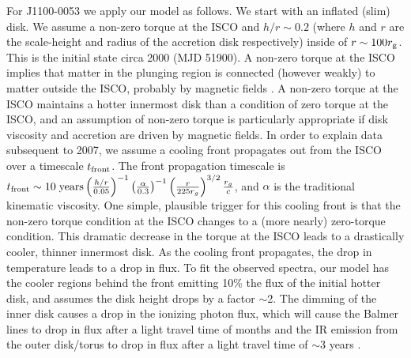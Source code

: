 \documentclass{nature}
\begin{document}
For J1100-0053 we apply our model as follows. We start with an
inflated (slim) disk. We assume a non-zero torque at the ISCO and
$h/r\sim0.2$ (where $h$ and $r$ are the scale-height and radius of the
accretion disk respectively) inside of $r\sim100 r_{\rm g}$.  This is
the initial state circa 2000 (MJD 51900). A non-zero torque at the
ISCO implies that matter in the plunging region is connected (however
weakly) to matter outside the ISCO, probably by magnetic fields
\cite[e.g., ][]{Gammie1999, Agol_Krolik2000}. A non-zero torque at the
ISCO maintains a hotter innermost disk than a condition of zero torque
at the ISCO, and an assumption of non-zero torque is particularly
appropriate if disk viscosity and accretion are driven by magnetic
fields. In order to explain data subsequent to 2007, we assume a
cooling front propagates out from the ISCO over a timescale $t_{\rm
front}$. The front propagation timescale is $ t_{\rm front} \sim 10 \;
{\rm years} \left(\frac{h/r}{0.05}\right)^{-1}
\left(\frac{\alpha}{0.3}\right)^{-1}
\left(\frac{r}{225r_{g}}\right)^{3/2} \frac{r_{g}}{c}$, and $\alpha$
is the traditional kinematic viscosity. One simple, plausible trigger
for this cooling front is that the non-zero torque condition at the
ISCO changes to a (more nearly) zero-torque condition. This dramatic
decrease in the torque at the ISCO leads to a drastically cooler,
thinner innermost disk. As the cooling front propagates, the drop in
temperature leads to a drop in flux. To fit the observed spectra, our 
model has the cooler regions
behind the front emitting 10\% the flux of the initial hotter disk,
and assumes the disk height drops by a factor $\sim$2. The dimming of the
inner disk causes a drop in the ionizing photon flux, which will cause
the Balmer lines to drop in flux after a light travel time of months
and the IR emission from the outer disk/torus to drop in flux after a
light travel time of $\sim$3 years \citep{Sirko_Goodman2003, Jun2015}.
\end{document}
